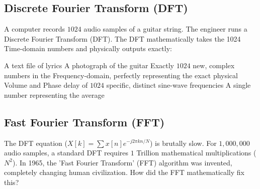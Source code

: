 \clearpage

\subsection{Discrete Fourier Transform (DFT)}

A computer records $1024$ audio samples of a guitar string. The engineer runs a Discrete Fourier Transform (DFT). The DFT mathematically takes the 1024 Time-domain numbers and physically outputs exactly:

\begin{choices}
    \choice A text file of lyrics
    \choice A photograph of the guitar
    \correctchoice Exactly $1024$ new, complex numbers in the Frequency-domain, perfectly representing the exact physical Volume and Phase delay of $1024$ specific, distinct sine-wave frequencies
    \choice A single number representing the average
\end{choices}


\clearpage

\subsection{Fast Fourier Transform (FFT)}

The DFT equation ($X[k] = \sum x[n] e^{-j2\pi kn/N}$) is brutally slow. For $1,000,000$ audio samples, a standard DFT requires $1$ Trillion mathematical multiplications ($N^2$). In 1965, the 'Fast Fourier Transform' (FFT) algorithm was invented, completely changing human civilization. How did the FFT mathematically fix this?

